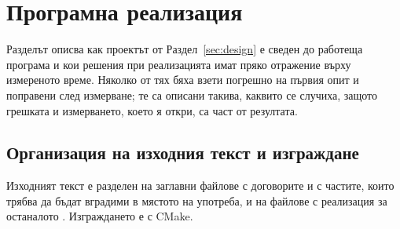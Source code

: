 \section{Програмна реализация}
\label{sec:implementation}

Разделът описва как проектът от Раздел~\ref{sec:design} е сведен до работеща програма
и кои решения при реализацията имат пряко отражение върху измереното време. Няколко
от тях бяха взети погрешно на първия опит и поправени след измерване; те са описани
такива, каквито се случиха, защото грешката и измерването, което я откри, са част от
резултата.

\subsection{Организация на изходния текст и изграждане}
\label{subsec:impl-layout}

Изходният текст е разделен на заглавни файлове с договорите и с частите, които трябва
да бъдат вградими в мястото на употреба, и на файлове с реализация за останалото
. Изграждането е с CMake.

